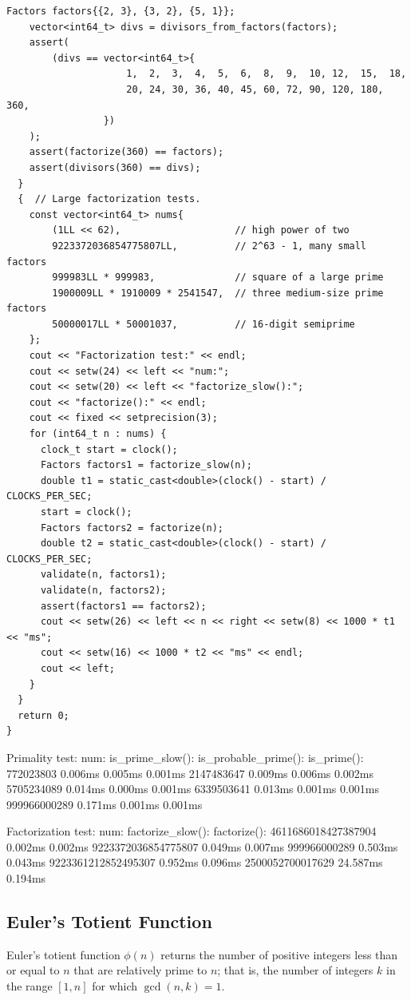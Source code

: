 \begin{lstlisting}[style=cpp]
    Factors factors{{2, 3}, {3, 2}, {5, 1}};
    vector<int64_t> divs = divisors_from_factors(factors);
    assert(
        (divs == vector<int64_t>{
                     1,  2,  3,  4,  5,  6,  8,  9,  10, 12,  15,  18,
                     20, 24, 30, 36, 40, 45, 60, 72, 90, 120, 180, 360,
                 })
    );
    assert(factorize(360) == factors);
    assert(divisors(360) == divs);
  }
  {  // Large factorization tests.
    const vector<int64_t> nums{
        (1LL << 62),                    // high power of two
        9223372036854775807LL,          // 2^63 - 1, many small factors
        999983LL * 999983,              // square of a large prime
        1900009LL * 1910009 * 2541547,  // three medium-size prime factors
        50000017LL * 50001037,          // 16-digit semiprime
    };
    cout << "Factorization test:" << endl;
    cout << setw(24) << left << "num:";
    cout << setw(20) << left << "factorize_slow():";
    cout << "factorize():" << endl;
    cout << fixed << setprecision(3);
    for (int64_t n : nums) {
      clock_t start = clock();
      Factors factors1 = factorize_slow(n);
      double t1 = static_cast<double>(clock() - start) / CLOCKS_PER_SEC;
      start = clock();
      Factors factors2 = factorize(n);
      double t2 = static_cast<double>(clock() - start) / CLOCKS_PER_SEC;
      validate(n, factors1);
      validate(n, factors2);
      assert(factors1 == factors2);
      cout << setw(26) << left << n << right << setw(8) << 1000 * t1 << "ms";
      cout << setw(16) << 1000 * t2 << "ms" << endl;
      cout << left;
    }
  }
  return 0;
}
\end{lstlisting}
\begin{exampleoutput}
Primality test:
num:           is_prime_slow():  is_probable_prime():  is_prime():
772023803            0.006ms           0.005ms           0.001ms
2147483647           0.009ms           0.006ms           0.002ms
5705234089           0.014ms           0.000ms           0.001ms
6339503641           0.013ms           0.001ms           0.001ms
999966000289         0.171ms           0.001ms           0.001ms

Factorization test:
num:                    factorize_slow():   factorize():
4611686018427387904          0.002ms           0.002ms
9223372036854775807          0.049ms           0.007ms
999966000289                 0.503ms           0.043ms
9223361212852495307          0.952ms           0.096ms
2500052700017629            24.587ms           0.194ms
\end{exampleoutput}
\subsection{Euler's Totient Function}
\label{sec:6.3.10}
Euler's totient function $\phi(n)$ returns the number of positive integers less than or equal to $n$ that are relatively prime to $n$; that is, the number of integers $k$ in the range $[1, n]$ for which $\gcd(n, k) = 1$.

